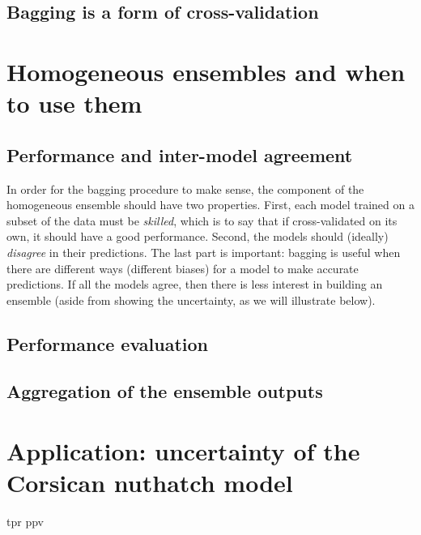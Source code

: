 \documentclass[
  letterpaper,
]{scrbook}
\begin{document}
\subsection{Bagging is a form of
cross-validation}\label{bagging-is-a-form-of-cross-validation}

\section{Homogeneous ensembles and when to use
them}\label{homogeneous-ensembles-and-when-to-use-them}

\subsection{Performance and inter-model
agreement}\label{performance-and-inter-model-agreement}

In order for the bagging procedure to make sense, the component of the
homogeneous ensemble should have two properties. First, each model
trained on a subset of the data must be \emph{skilled}, which is to say
that if cross-validated on its own, it should have a good performance.
Second, the models should (ideally) \emph{disagree} in their
predictions. The last part is important: bagging is useful when there
are different ways (different biases) for a model to make accurate
predictions. If all the models agree, then there is less interest in
building an ensemble (aside from showing the uncertainty, as we will
illustrate below).

\subsection{Performance evaluation}\label{performance-evaluation-1}

\subsection{Aggregation of the ensemble
outputs}\label{aggregation-of-the-ensemble-outputs}

\section{Application: uncertainty of the Corsican nuthatch
model}\label{application-uncertainty-of-the-corsican-nuthatch-model}

tpr ppv
\end{document}
